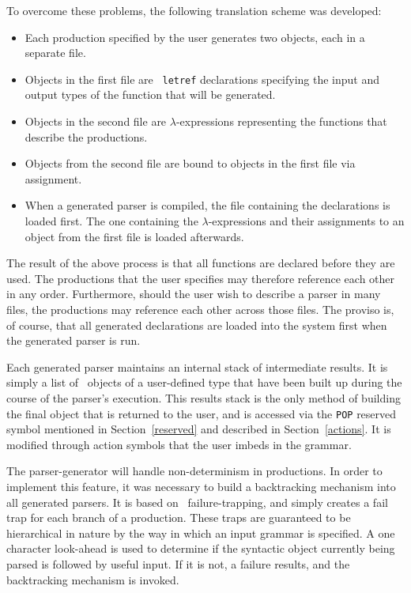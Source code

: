   To overcome these problems, the following translation scheme was developed:
  \begin{itemize}
  \item Each production specified by the user generates two objects, each 
        in a separate file.
  \item Objects in the first file are \ML\ {\tt letref} declarations 
        specifying the input and output types of the function that will 
        be generated.  
  \item Objects in the second file are $\lambda$-expressions representing the
        functions that describe the productions.
  \item Objects from the second file are bound to objects in the first file
        via assignment.
  \item When a generated parser is compiled, the file containing the
        declarations is loaded first.  The one containing the 
        $\lambda$-expressions
        and their assignments to an object from the first file is loaded 
        afterwards.
  \end{itemize}
  The result of the above process is that all functions are declared before 
  they are
  used.  The productions that the user specifies may therefore reference
  each other in any order.  Furthermore, should the user wish to describe 
  a parser
  in many files, the productions may reference each other across those files.
  The proviso is, of course, that all generated declarations are loaded into 
  the system first when the generated parser is run.

  Each generated parser maintains an internal stack of intermediate results. 
  It is simply a list of \ML\ objects of a user-defined type
  that have been built up during the course of the parser's execution.  
  This results stack is
  the only method of building the final object that is returned to the user,
  and is accessed via the \verb"POP" reserved 
  symbol mentioned in 
  Section~\ref{reserved} and described in Section~\ref{actions}.  It is 
  modified through action symbols that the user imbeds in the grammar.

  The parser-generator will handle non-determinism
  in productions.
  In order to implement this feature, it was necessary to build a backtracking 
  mechanism into all generated parsers.  It is based on \ML\
  failure-trapping, and simply creates a fail trap for each
  branch of a production.  These traps are guaranteed to be hierarchical in
  nature by the way in which an input grammar is specified.  A one character
  look-ahead is used to determine if the syntactic object currently being
  parsed is followed by useful input.  If it is not, a failure results, and the
  backtracking mechanism is invoked.

